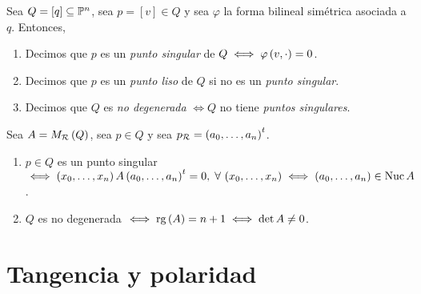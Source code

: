 \begin{defi}
  Sea $Q=\left[ q \right] \subseteq \mathbb{P} ^n$, sea $p = \left[ v \right] \in Q$ y sea $\varphi$ la forma bilineal simétrica asociada a $q$. Entonces, 
  \begin{enumerate}[(1)] 
    \item Decimos que $p$ es un \textit{punto singular} de $Q \iff \varphi \left( v, \cdot \right) = 0$.
    \item Decimos que $p$ es un \textit{punto liso} de $Q$ si no es un \textit{punto singular}.
    \item Decimos que $Q$ es \textit{no degenerada} $\iff Q$ no tiene \textit{puntos singulares}. 
  \end{enumerate}
\end{defi}

\begin{obs}
  Sea $A=M_{\mathcal{R}} \left( Q \right)$, sea $p \in Q$ y sea $p_{\mathcal{R}} = \left( a_0, \dots , a_n \right) ^t$.
  \begin{enumerate}[(1)]
    \item $p\in Q$ es un punto singular $\iff \left( x_0, \dots , x_n \right) A \left( a_0, \dots , a_n \right) ^t = 0, \; \forall \, \left( x_0, \dots , x_n \right) \iff \left( a_0, \dots , a_n \right) \in \operatorname{Nuc} A$.
    \item $Q$ es no degenerada $\iff \operatorname{rg} \left( A \right) = n+1 \iff \det A \neq 0$.
  \end{enumerate}
\end{obs}



\section{Tangencia y polaridad}

